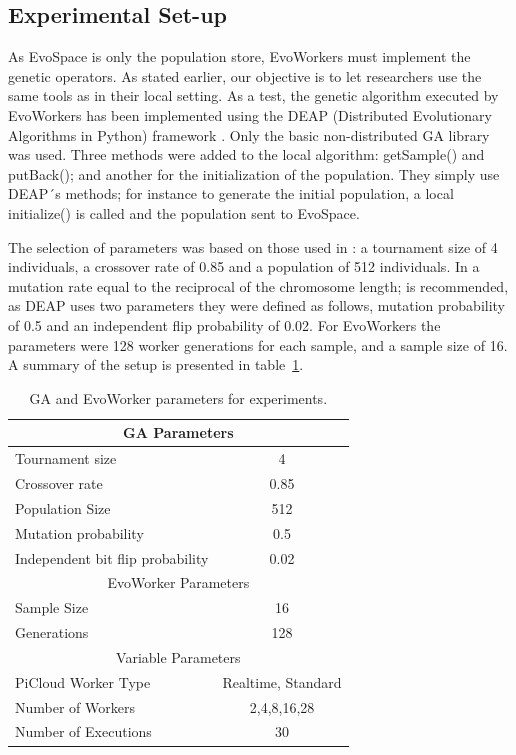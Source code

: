 \documentclass{llncs}
\begin{document}
\subsection{Experimental Set-up}
As EvoSpace is only the population store, EvoWorkers must implement the genetic operators. As stated earlier, our objective is to let researchers use the same tools as in their local setting. As a test, the genetic algorithm executed by EvoWorkers has been implemented using the DEAP (Distributed Evolutionary Algorithms in Python) framework \cite{DEAP_JMLR2012}. Only the basic non-distributed GA library was used. Three methods were added to the local algorithm: getSample() and  putBack(); and  another for the  initialization of the population. They simply use DEAP´s methods; for instance to generate the initial population, a local initialize() is called and the population sent to EvoSpace.

The selection of parameters was based on those used in \cite{Alba:2002dq}: a
tournament size of 4 individuals, a crossover rate of 0.85 and a
population of 512 individuals. In  \cite{Jong:PS97} a mutation rate
equal to the reciprocal of the chromosome length; is recommended, as
DEAP uses two parameters they were defined as follows, mutation
probability of 0.5 and an independent flip probability of 0.02. For
EvoWorkers the parameters were 128 worker generations for each
sample, and a sample size of 16. A summary of the setup is presented in table~\ref{params}.

\begin{table}[!t]
\renewcommand{\arraystretch}{1.3}
\caption{GA and EvoWorker parameters for experiments.}
\label{params}
\centering
\begin{tabular}{|l|c|}
\hline
\multicolumn{2}{|c|}{GA Parameters} \\
\hline
Tournament size & 4 \\
Crossover rate & 0.85  \\
Population Size & 512 \\
Mutation probability & 0.5 \\
Independent bit flip probability  & 0.02 \\
\hline
\multicolumn{2}{|c|}{EvoWorker Parameters} \\
\hline
Sample Size & 16 \\
Generations & 128 \\
\hline
\multicolumn{2}{|c|}{Variable Parameters} \\
\hline
PiCloud Worker Type & Realtime, Standard \\
Number of Workers & 2,4,8,16,28 \\
Number of Executions & 30 \\
\hline

\end{tabular}
\end{table}
\end{document}
